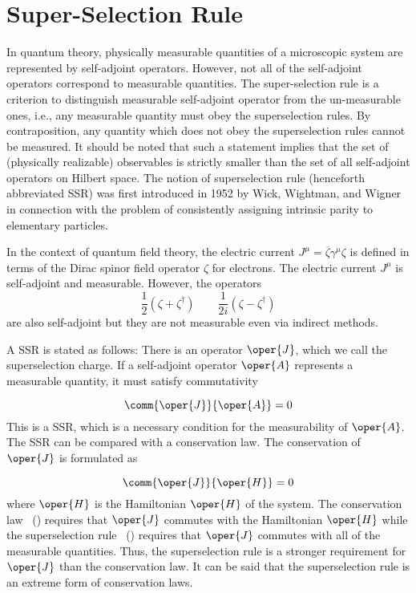 \chapter{Super-Selection Rule\label{appen:superselection}}


In quantum theory, physically measurable quantities of a microscopic system are represented by self-adjoint operators. However, not all of the self-adjoint operators correspond to measurable quantities. The super-selection rule is a criterion to distinguish measurable self-adjoint operator from the un-measurable ones, i.e., any measurable quantity must obey the superselection rules. By contraposition, any quantity which does not obey the superselection rules cannot be measured. It should be noted that
such a statement implies that the set of (physically realizable) observables is strictly
smaller than the set of all self-adjoint operators on Hilbert space. The notion of superselection rule (henceforth abbreviated SSR) was first introduced
in 1952 by Wick, Wightman, and Wigner~\cite{Wick:1952nb} in connection with the problem of consistently assigning intrinsic parity to elementary particles.


In the context of quantum field theory, the electric current \( J^\mu  = \overline{\zeta}\gamma^\mu \zeta\) is defined in terms of the Dirac spinor field operator \(\zeta\) for electrons. The electric current $J^\mu$ is self-adjoint and measurable. However, the operators
\begin{equation}
	\frac{1}{2}\left(\zeta + \zeta^\dagger \right) \qquad \frac{1}{2i}\left(\zeta - \zeta^\dagger \right)
\end{equation}
are also self-adjoint but they are not measurable even via indirect methods.




A SSR is stated as follows: There is an operator $\oper{J}$, which we call the
superselection charge. If a self-adjoint operator $\oper{A}$ represents a measurable quantity, it must
satisfy commutativity~\cite{TanimuraSuperSelection}

\begin{equation}
	\label{eq:superselection_law}
	\comm{\oper{J}}{\oper{A}} = 0
\end{equation}
This is a SSR, which is a necessary condition for the measurability of $\oper{A}$.
The SSR can be compared with a conservation law. The conservation of
$\oper{J}$ is formulated as

\begin{equation}
	\label{eq:conservation_law}
	\comm{\oper{J}}{\oper{H}} = 0
\end{equation}
where $\oper{H}$ is the Hamiltonian $\oper{H}$ of the system. The conservation law ~() requires that
$\oper{J}$ commutes with the Hamiltonian $\oper{H}$ while the superselection rule ~() requires that $\oper{J}$ commutes with all of the measurable quantities. Thus, the superselection rule is a stronger requirement for $\oper{J}$ than the conservation law. It can be said that the superselection rule is an extreme form of conservation laws.


